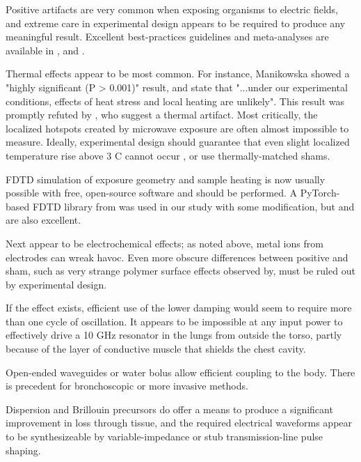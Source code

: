 \documentclass[paper.tex]{subfiles}
\begin{document}
\begin{multicols}{1}
Positive artifacts are very common when exposing organisms to electric fields, and extreme care in experimental design appears to be required to produce any meaningful result. Excellent best-practices guidelines and meta-analyses are available in \cite{Biological2016} \cite{Comprehensive2018} \cite{Funding2019}, \cite{chou1996radio} and \cite{Effects2016}.

Thermal effects appear to be most common. For instance, Manikowska\cite{Effects1985a} showed a "highly significant (P > 0.001)" result, and state that "...under our experimental conditions, effects of heat stress and local heating are unlikely". This result was promptly refuted by \cite{Cytogenetic1986}, who suggest a thermal artifact. Most critically, the localized hotspots created by microwave exposure are often almost impossible to measure. Ideally, experimental design should guarantee that even slight localized temperature rise above 3 C cannot occur \cite{Sharp1983}\cite{Effects1951}\cite{DNA2004}, or use thermally-matched shams\cite{Basic1983}.

FDTD simulation of exposure geometry and sample heating is now usually possible with free, open-source software and should be performed. A PyTorch-based FDTD library from \cite{Highly2019} was used in our study with some modification, but \cite{CUDAbased2019} and \cite{openEMS} are also excellent. 

Next appear to be electrochemical\cite{Comparative2003} effects; as noted above, metal ions from electrodes can wreak havoc. Even more obscure differences between positive and sham, such as very strange polymer surface effects observed by\cite{Effect1994a}, must be ruled out by experimental design.

If the effect exists, efficient use of the lower damping would seem to require more than one cycle of oscillation. It appears to be impossible at any input power to effectively drive a 10 GHz resonator in the lungs from outside the torso, partly because of the layer of conductive muscle that shields the chest cavity.

Open-ended waveguides\cite{OpenEnded1982}\cite{Analysis1989}\cite{142018} or water bolus allow efficient coupling to the body. There is precedent for bronchoscopic \cite{Flexible2019}\cite{Antenna2018} or more invasive methods\cite{Implantable1980}\cite{Implantable1982}\cite{Electromagnetic1983}. 

Dispersion and Brillouin precursors do offer a means to produce a significant improvement in loss through tissue, and the required electrical waveforms appear to be synthesizeable by variable-impedance or stub transmission-line pulse shaping\cite{Coaxial1985}\cite{Arbitrarya}. 


\end{multicols}
\end{document}
